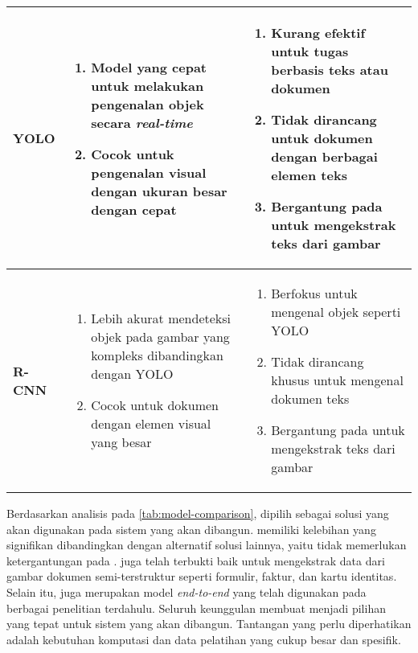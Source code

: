 \begin{table}[h!]
\begin{tabularx}{\linewidth}{|p{2cm}|X|X|}
\textbf{YOLO} &
\begin{enumerate}
    \item Model yang cepat untuk melakukan pengenalan objek secara \textit{real-time}
    \item Cocok untuk pengenalan visual dengan ukuran besar dengan cepat
\end{enumerate}
&
\begin{enumerate}
    \item Kurang efektif untuk tugas berbasis teks atau dokumen
    \item Tidak dirancang untuk dokumen dengan berbagai elemen teks
    \item Bergantung pada \ocr{} untuk mengekstrak teks dari gambar
\end{enumerate}
\\ \hline
\textbf{R-CNN} &
\begin{enumerate}
    \item Lebih akurat mendeteksi objek pada gambar yang kompleks dibandingkan dengan YOLO
    \item Cocok untuk dokumen dengan elemen visual yang besar
\end{enumerate}
&
\begin{enumerate}
    \item Berfokus untuk mengenal objek seperti YOLO
    \item Tidak dirancang khusus untuk mengenal dokumen teks
    \item Bergantung pada \ocr{} untuk mengekstrak teks dari gambar
\end{enumerate}
\\ \hline
\end{tabularx}
\end{table}

Berdasarkan analisis pada \autoref{tab:model-comparison}, \donut{} dipilih sebagai solusi yang akan digunakan pada sistem yang akan dibangun. \donut{} memiliki kelebihan yang signifikan dibandingkan dengan alternatif solusi lainnya, yaitu tidak memerlukan ketergantungan pada \ocr. \donut{} juga telah terbukti baik untuk mengekstrak data dari gambar dokumen semi-terstruktur seperti formulir, faktur, dan kartu identitas. Selain itu, \donut{} juga merupakan model \sota{} \emph{end-to-end} yang telah digunakan pada berbagai penelitian terdahulu. Seluruh keunggulan \donut{} membuat \donut{} menjadi pilihan yang tepat untuk sistem yang akan dibangun. Tantangan yang perlu diperhatikan adalah kebutuhan komputasi dan data pelatihan yang cukup besar dan spesifik.



